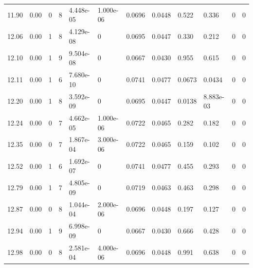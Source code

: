 \documentclass[preview]{standalone}
\begin{document}
{{{{\begin{tabular}{L{1.2cm}C{1.2cm} C{0.3cm}C{0.5cm} C{1.4cm}C{1.4cm} C{1.4cm}C{1.4cm} C{1.6cm}C{1.6cm} C{1.6cm}C{1.6cm}}
  11.90  &  0.00  & 0     &  8 &  4.448e-05  & 1.000e-06  &  0.0696&   0.0448& 0.522 & 0.336   &  0 & 0  \\ 
  12.06  &  0.00  & 1     &  8 &  4.129e-08  & 0  &  0.0695&   0.0447& 0.330 & 0.212   &  0 & 0  \\ 
  12.10  &  0.00  & 1     &  9 &  9.504e-08  & 0  &  0.0667&   0.0430& 0.955 & 0.615   &  0 & 0  \\ 
  12.11  &  0.00  & 1     &  6 &  7.680e-10  & 0  &  0.0741&   0.0477& 0.0673 & 0.0434   &  0 & 0  \\ 
  12.20  &  0.00  & 1     &  8 &  3.592e-09  & 0  &  0.0695&   0.0447& 0.0138 & 8.883e-03   &  0 & 0  \\ 
  12.24  &  0.00  & 0     &  7 &  4.662e-05  & 1.000e-06  &  0.0722&   0.0465& 0.282 & 0.182   &  0 & 0  \\ 
  12.35  &  0.00  & 0     &  7 &  1.867e-04  & 3.000e-06  &  0.0722&   0.0465& 0.159 & 0.102   &  0 & 0  \\ 
  12.52  &  0.00  & 1     &  6 &  1.692e-07  & 0  &  0.0741&   0.0477& 0.455 & 0.293   &  0 & 0  \\ 
  12.79  &  0.00  & 1     &  7 &  4.805e-09  & 0  &  0.0719&   0.0463& 0.463 & 0.298   &  0 & 0  \\ 
  12.87  &  0.00  & 0     &  8 &  1.044e-04  & 2.000e-06  &  0.0696&   0.0448& 0.197 & 0.127   &  0 & 0  \\ 
  12.94  &  0.00  & 1     &  9 &  6.998e-09  & 0  &  0.0667&   0.0430& 0.666 & 0.428   &  0 & 0  \\ 
  12.98  &  0.00  & 0     &  8 &  2.581e-04  & 4.000e-06  &  0.0696&   0.0448& 0.991 & 0.638   &  0 & 0  \\ 
\hline 
\end{tabular} 

}}}}
\end{document}
